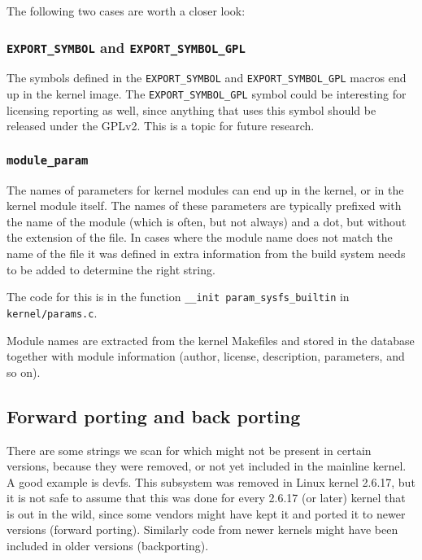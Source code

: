 \documentclass[10pt,a4paper]{article}
\begin{document}
The following two cases are worth a closer look:

\subsubsection{\texttt{EXPORT\_SYMBOL} and \texttt{EXPORT\_SYMBOL\_GPL}}

The symbols defined in the \texttt{EXPORT\_SYMBOL} and
\texttt{EXPORT\_SYMBOL\_GPL} macros end up in the kernel image. The
\texttt{EXPORT\_SYMBOL\_GPL} symbol could be interesting for licensing
reporting as well, since anything that uses this symbol should be released
under the GPLv2. This is a topic for future research.

\subsubsection{\texttt{module\_param}}

The names of parameters for kernel modules can end up in the kernel, or in the
kernel module itself. The names of these parameters are typically prefixed
with the name of the module (which is often, but not always) and a dot, but
without the extension of the file. In cases where the module name does not
match the name of the file it was defined in extra information from the
build system needs to be added to determine the right string.

The code for this is in the function \texttt{\_\_init param\_sysfs\_builtin} in
\texttt{kernel/params.c}.

Module names are extracted from the kernel Makefiles and stored in the database
together with module information (author, license, description, parameters,
and so on).

\subsection{Forward porting and back porting}

There are some strings we scan for which might not be present in certain
versions, because they were removed, or not yet included in the mainline
kernel. A good example is devfs. This subsystem was removed in Linux kernel
2.6.17, but it is not safe to assume that this was done for every 2.6.17 (or
later) kernel that is out in the wild, since some vendors might have kept it
and ported it to newer versions (forward porting). Similarly code from newer
kernels might have been included in older versions
(backporting).
\end{document}
